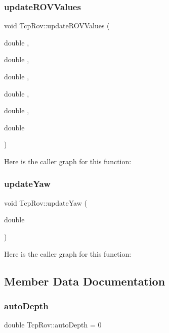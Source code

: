 \subsubsection{\texorpdfstring{update\+R\+O\+V\+Values}{updateROVValues}}
{\footnotesize\ttfamily void Tcp\+Rov\+::update\+R\+O\+V\+Values (\begin{DoxyParamCaption}\item[{double}]{,  }\item[{double}]{,  }\item[{double}]{,  }\item[{double}]{,  }\item[{double}]{,  }\item[{double}]{ }\end{DoxyParamCaption})\hspace{0.3cm}{\ttfamily [signal]}}

Here is the caller graph for this function\+:
\mbox{\label{class_tcp_rov_a35dad4ad0097ef7a4ca3f47b0d907bf3}} 
\subsubsection{\texorpdfstring{update\+Yaw}{updateYaw}}
{\footnotesize\ttfamily void Tcp\+Rov\+::update\+Yaw (\begin{DoxyParamCaption}\item[{double}]{ }\end{DoxyParamCaption})\hspace{0.3cm}{\ttfamily [signal]}}

Here is the caller graph for this function\+:


\subsection{Member Data Documentation}
\mbox{\label{class_tcp_rov_a9b3e9d308a427b0937d90950ba9ca25e}} 
\subsubsection{\texorpdfstring{auto\+Depth}{autoDepth}}
{\footnotesize\ttfamily double Tcp\+Rov\+::auto\+Depth = 0}

